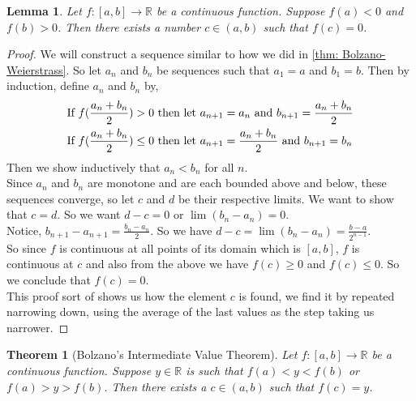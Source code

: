 \documentclass{article}
\newtheorem{theorem}{Theorem}[section]
\newtheorem{lemma}{Lemma}[section]
\theoremstyle{definition}
\theoremstyle{remark}
\begin{document}
\vspace{.5cm}



\begin{lemma}\label{lem:ivt at c = 0}
Let $f : [a,b] \to \mathbb{R}$ be a continuous function. Suppose $f(a) < 0$ and $f(b) > 0$. Then there exists a number $c \in (a,b)$ such that $f(c) = 0$.
\end{lemma}


\begin{proof}
We will construct a sequence similar to how we did in \ref{thm: Bolzano-Weierstrass}.
So let $a_n$ and $b_n$ be sequences such that $a_1 = a$ and $b_1 = b$. Then by induction, 
define $a_n$ and $b_n$ by,
\begin{align*}
& \textnormal{If } f(\frac{a_n + b_n}{2}) > 0 \textnormal{ then let } a_{n+1} = a_n \textnormal{ and } b_{n+1} = \frac{a_n + b_n}{2}\\
& \textnormal{If } f(\frac{a_n + b_n}{2}) \leq 0 \textnormal{ then let } a_{n+1} = \frac{a_n + b_n}{2} \textnormal{ and } b_{n+1} = b_n
\end{align*}
Then we show inductively that $a_n < b_n$ for all $n$.\\
Since $a_n$ and $b_n$ are monotone and are each bounded above and below, 
these sequences converge, so let $c$ and $d$ be their respective limits. We 
want to show that $c=d$. So we want $d-c = 0$ or $\lim(b_n - a_n) = 0$. \\
Notice, $b_{n+1} - a_{n+1} = \frac{b_n - a_n}{2}$. So we have $d-c = \lim(b_n - a_n) = \frac{b - a}{2^{n-1}}$.\\
So since $f$ is continuous at all points of its domain which is $[a,b]$, 
$f$ is continuous at $c$ and also from the above we have $f(c) \geq 0$ and $f(c) \leq 0$.
So we conclude that $f(c) = 0$. \\
This proof sort of shows us how the element $c$ is found, we find it by repeated
narrowing down, using the average of the last values as the step taking 
us narrower. 
\end{proof}

\vspace{.5cm}



\begin{theorem}[Bolzano's Intermediate Value Theorem]\label{lem:ivt}
Let $f : [a,b] \to \mathbb{R}$ be a continuous function. Suppose $y \in \mathbb{R}$ is such that $f(a) < y < f(b)$ or $f(a) > y > f(b)$. Then there exists a $c \in (a,b)$ such that $f(c) = y$.
\end{theorem}
\end{document}
